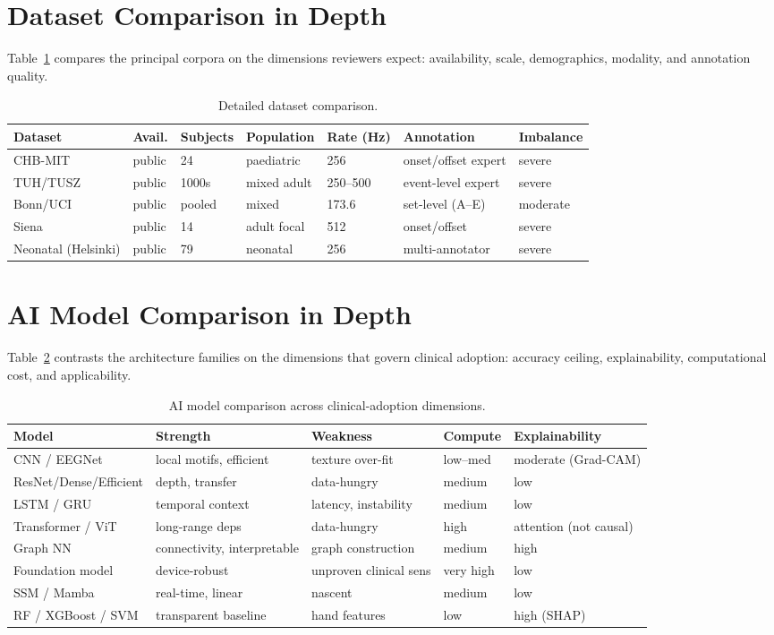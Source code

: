 \section{Dataset Comparison in Depth}
Table~\ref{tab:dscmp} compares the principal corpora on the dimensions reviewers expect: availability, scale, demographics, modality, and annotation quality.
\begin{table}[t]\centering\caption{Detailed dataset comparison.}\label{tab:dscmp}
\footnotesize\begin{tabular}{lllllll}\toprule
Dataset & Avail. & Subjects & Population & Rate (Hz) & Annotation & Imbalance\\\midrule
CHB-MIT & public & 24 & paediatric & 256 & onset/offset expert & severe\\
TUH/TUSZ & public & 1000s & mixed adult & 250--500 & event-level expert & severe\\
Bonn/UCI & public & pooled & mixed & 173.6 & set-level (A--E) & moderate\\
Siena & public & 14 & adult focal & 512 & onset/offset & severe\\
Neonatal (Helsinki) & public & 79 & neonatal & 256 & multi-annotator & severe\\\bottomrule
\end{tabular}\end{table}

\section{AI Model Comparison in Depth}
Table~\ref{tab:modelcmp} contrasts the architecture families on the dimensions that govern clinical adoption: accuracy ceiling, explainability, computational cost, and applicability.
\begin{table}[t]\centering\caption{AI model comparison across clinical-adoption dimensions.}\label{tab:modelcmp}
\footnotesize\begin{tabular}{lllll}\toprule
Model & Strength & Weakness & Compute & Explainability\\\midrule
CNN / EEGNet & local motifs, efficient & texture over-fit & low--med & moderate (Grad-CAM)\\
ResNet/Dense/Efficient & depth, transfer & data-hungry & medium & low\\
LSTM / GRU & temporal context & latency, instability & medium & low\\
Transformer / ViT & long-range deps & data-hungry & high & attention (not causal)\\
Graph NN & connectivity, interpretable & graph construction & medium & high\\
Foundation model & device-robust & unproven clinical sens & very high & low\\
SSM / Mamba & real-time, linear & nascent & medium & low\\
RF / XGBoost / SVM & transparent baseline & hand features & low & high (SHAP)\\\bottomrule
\end{tabular}\end{table}

